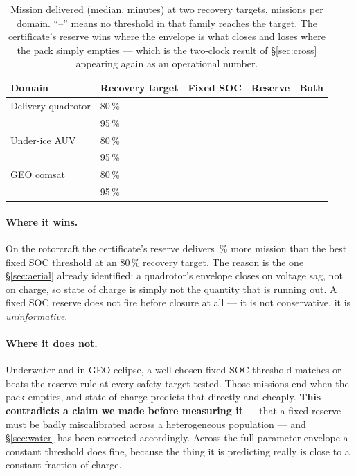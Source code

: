 \documentclass[11pt,letterpaper]{article}
\theoremstyle{definition}
\theoremstyle{remark}
\begin{document}
\begin{table}[t]\centering\small
\caption{Mission delivered (median, minutes) at two recovery targets, \bTwoTrials{} missions per
domain. ``--'' means no threshold in that family reaches the target. The certificate's reserve
wins where the envelope is what closes and loses where the pack simply empties --- which is the
two-clock result of \S\ref{sec:cross} appearing again as an operational number.}
\label{tab:domainbaselines}
\begin{tabular}{@{}llrrr@{}}
\toprule
\textbf{Domain} & \textbf{Recovery target} & \textbf{Fixed SOC} & \textbf{Reserve} &
\textbf{Both} \\
\midrule
Delivery quadrotor & 80\,\% & \bTwoAirSocEighty{} & \textbf{\bTwoAirResEighty{}} & \bTwoAirBothEighty{} \\
                   & 95\,\% & \bTwoAirSocNinetyfive{} & \bTwoAirResNinetyfive{} & \bTwoAirBothNinetyfive{} \\
\addlinespace
Under-ice AUV      & 80\,\% & \textbf{\bTwoSeaSocEighty{}} & \bTwoSeaResEighty{} & \bTwoSeaBothEighty{} \\
                   & 95\,\% & \textbf{\bTwoSeaSocNinetyfive{}} & \bTwoSeaResNinetyfive{} & \bTwoSeaBothNinetyfive{} \\
\addlinespace
GEO comsat         & 80\,\% & \textbf{\bTwoGeoSocEighty{}} & \bTwoGeoResEighty{} & \bTwoGeoBothEighty{} \\
                   & 95\,\% & \textbf{\bTwoGeoSocNinetyfive{}} & \bTwoGeoResNinetyfive{} & \bTwoGeoBothNinetyfive{} \\
\bottomrule
\end{tabular}
\end{table}

\paragraph{Where it wins.} On the rotorcraft the certificate's reserve delivers
\bTwoAirGainEighty\,\% more mission than the best fixed SOC threshold at an 80\,\% recovery
target. The reason is the one \S\ref{sec:aerial} already identified: a quadrotor's envelope
closes on voltage sag, not on charge, so state of charge is simply not the quantity that is
running out. A fixed SOC reserve does not fire before closure at all --- it is not conservative,
it is \emph{uninformative}.

\paragraph{Where it does not.} Underwater and in GEO eclipse, a well-chosen fixed SOC threshold
matches or beats the reserve rule at every safety target tested. Those missions end when the
pack empties, and state of charge predicts that directly and cheaply. \textbf{This contradicts a
claim we made before measuring it} --- that a fixed reserve must be badly miscalibrated across a
heterogeneous population --- and \S\ref{sec:water} has been corrected accordingly. Across the
full parameter envelope a constant threshold does fine, because the thing it is predicting
really is close to a constant fraction of charge.
\end{document}
